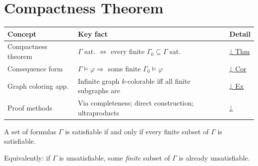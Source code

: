 
\section{Compactness Theorem}

\begin{tcolorbox}[colback=gray!6, colframe=gray!40, arc=2pt,
  left=6pt, right=6pt, top=4pt, bottom=4pt,
  title={\small\textbf{Compactness — Quick Reference}},
  fonttitle=\small\bfseries]
\small
\begin{tabular}{l l l}
\toprule
\textbf{Concept} & \textbf{Key fact} & \textbf{Detail} \\
\midrule
Compactness theorem & $\Gamma$ sat. $\Longleftrightarrow$ every finite $\Gamma_0\subseteq\Gamma$ sat. & \hyperref[thm:compactness]{↓ Thm} \\
Consequence form    & $\Gamma\models\varphi \Rightarrow$ some finite $\Gamma_0\models\varphi$ & \hyperref[cor:consequence-compact]{↓ Cor} \\
Graph coloring app. & Infinite graph $k$-colorable iff all finite subgraphs are & \hyperref[ex:graph-color]{↓ Ex} \\
Proof methods       & Via completeness; direct construction; ultraproducts & \hyperref[rem:compact-proof]{↓} \\
\bottomrule
\end{tabular}
\end{tcolorbox}

\vspace{1em}

\begin{tcolorbox}[colback=thmbox, colframe=thmborder, arc=2pt,
  left=6pt, right=6pt, top=4pt, bottom=4pt,
  title={\small\textbf{Theorem (Compactness of Propositional Logic)}},
  fonttitle=\small\bfseries]
\label{thm:compactness}
A set of formulas $\Gamma$ is satisfiable if and only if every finite subset
of $\Gamma$ is satisfiable.

Equivalently: if $\Gamma$ is unsatisfiable, some \emph{finite} subset of
$\Gamma$ is already unsatisfiable.
\end{tcolorbox}

